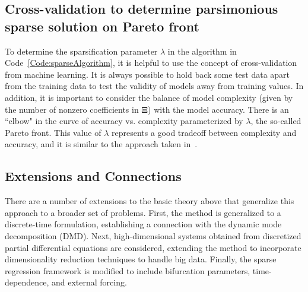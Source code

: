 \documentclass[onecolumn,11pt]{article}
\newcommand{\bXi}{\boldsymbol{\Xi}}
\begin{document}
\subsection{Cross-validation to determine parsimonious sparse solution on Pareto front}
To determine the sparsification parameter $\lambda$ in the algorithm in Code~\eqref{Code:sparseAlgorithm}, it is helpful to use the concept of cross-validation from machine learning.  
It is always possible to hold back some test data apart from the training data to test the validity of models away from training values.  
In addition, it is important to consider the balance of model complexity (given by the number of nonzero coefficients in $\bXi$) with the model accuracy.  
There is an ``elbow" in the curve of accuracy vs. complexity parameterized by $\lambda$, the so-called Pareto front.  
This value of $\lambda$ represents a good tradeoff between complexity and accuracy, and it is similar to the approach taken in~\cite{Schmidt2009science}.




\subsection{Extensions and Connections}
There are a number of extensions to the basic theory above that generalize this approach to a broader set of problems.  First, the method is generalized to a discrete-time formulation, establishing a connection with the dynamic mode decomposition (DMD).  Next, high-dimensional systems obtained from discretized partial differential equations are considered, extending the method to incorporate dimensionality reduction techniques to handle big data.  Finally, the sparse regression framework is modified to include bifurcation parameters, time-dependence, and external forcing.  
 
\end{document}
